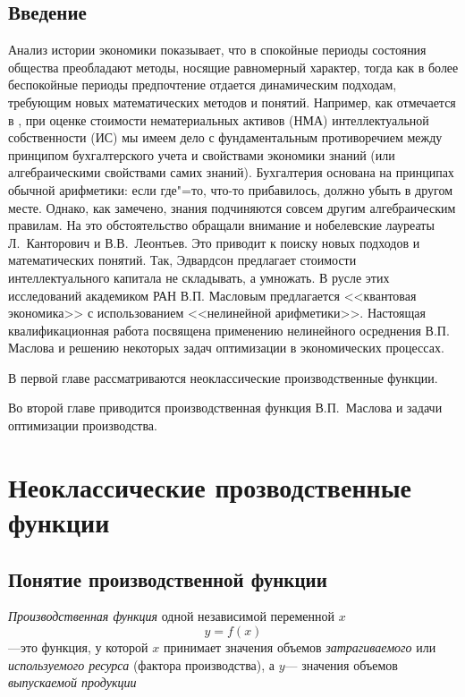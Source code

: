 \documentclass[12pt,openbib]{report}
\begin{document}

\Large
\tableofcontents
\newpage

\begin{center}
\section*{Введение}
\end{center}
Анализ истории экономики показывает, что в спокойные периоды состояния общества преобладают методы, носящие равномерный характер,
тогда как в более беспокойные периоды предпочтение отдается динамическим подходам, требующим новых математических методов и понятий.
Например, как отмечается в \cite{kozyreva}, при оценке стоимости нематериальных активов (НМА) интеллектуальной собственности (ИС)
мы имеем дело с фундаментальным противоречием между принципом бухгалтерского учета и свойствами экономики знаний (или алгебраическими свойствами самих знаний).
Бухгалтерия основана на принципах обычной арифметики: если где"=то, что-то прибавилось, должно убыть в другом месте.
Однако, как замечено, знания подчиняются совсем другим алгебраическим правилам.
На это обстоятельство обращали внимание и нобелевские лауреаты Л.~Канторович и В.В.~Леонтьев. Это приводит к поиску новых подходов и математических понятий.
Так, Эдвардсон \cite{kozyreva} предлагает стоимости интеллектуального капитала не складывать, а умножать. В русле этих исследований академиком
РАН В.П. Масловым предлагается <<квантовая экономика>> с использованием <<нелинейной арифметики>>.
Настоящая квалификационная работа посвящена применению нелинейного осреднения В.П. Маслова и решению некоторых задач оптимизации в экономических процессах.

В первой главе рассматриваются неоклассические производственные функции.

Во второй главе приводится производственная функция\linebreak
В.П.~Маслова и задачи оптимизации производства.


\chapter{Неоклассические прозводственные функции}

\section{Понятие производственной функции}

{\it Производственная функция} одной независимой переменной $x$
\begin{equation}\label{f11}
y=f(x)
\end{equation}
---это функция, у которой $x$ принимает значения
объемов {\it затрагиваемого} или {\it используемого ресурса}
(фактора производства), а $y$--- значения объемов {\it выпускаемой
продукции}
\end{document}
